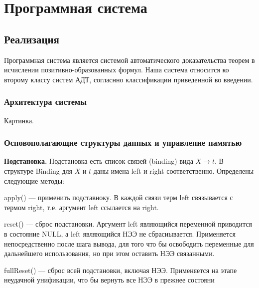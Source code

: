 \chapter{Программная система}


\section{Реализация}

Программная система является системой автоматического доказательства теорем в исчислении позитивно-образованных формул. Наша система относится ко второму классу систем АДТ, согласнно классификации приведенной во введении.

\subsection{Архитектура системы}
Картинка.


\subsection{Основополагающие структуры данных и управление памятью}

\textbf{Подстановка.} Подстановка есть список связей (binding) вида $X \rightarrow t$. В структуре Binding для $X$ и $t$ даны имена left и right соответственно. Определены следующие методы:

apply() --- применить подставноку. В каждой связи терм left связывается с термом right, т.е. аргумент left ссылается на right. 

reset() --- сброс подстановки. Аргумент left являющийся переменной приводится в состояние NULL, а left являющийся НЭЭ не сбрасиывается. Применяется непосредственно после шага вывода, для того что бы освободить переменные для дальнейшего использования, но при этом оставить НЭЭ связанными.

fullReset() --- сброс всей подстановки, включая НЭЭ. Применяется на этапе неудачной унификации, что бы вернуть все НЭЭ в прежнее состояни


